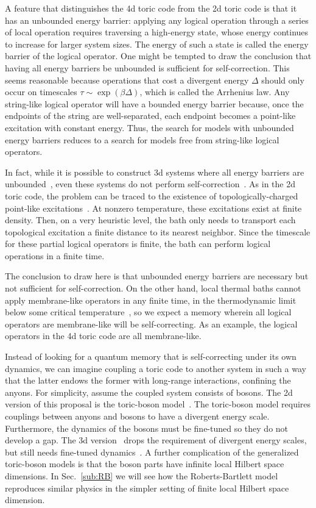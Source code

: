 A feature that distinguishes the 4d toric code from the 2d toric code is that it has an unbounded energy barrier: applying any logical operation through a series of local operation requires traversing a high-energy state, whose energy continues to increase for larger system sizes. The energy of such a state is called the energy barrier of the logical operator. One might be tempted to draw the conclusion that having all energy barriers be unbounded is sufficient for self-correction. This seems reasonable because operations that cost a divergent energy $\Delta$ should only occur on timescales $\tau \sim \exp (\beta \Delta)$, which is called the Arrhenius law. 
Any string-like logical operator will have a bounded energy barrier because, once the endpoints of the string are well-separated, each endpoint becomes a point-like excitation with constant energy. Thus, the search for models with unbounded energy barriers reduces to a search for models free from string-like logical operators.

In fact, while it is possible to construct 3d systems where all energy barriers are unbounded~\cite{Haah2011Code, Michnicki2014PowerLaw},
even these systems do not perform self-correction~\cite{Siva2017Marginally}. As in the 2d toric code, the problem can be traced to the existence of topologically-charged point-like excitations~\cite{PremHaahNandkishore2017}. At nonzero temperature, these excitations exist at finite density. Then, on a very heuristic level, the bath only needs to transport each topological excitation a finite distance to its nearest neighbor. Since the timescale for these partial logical operators is finite, the bath can perform logical operations in a finite time. 

The conclusion to draw here is that unbounded energy barriers are necessary but not sufficient for self-correction. On the other hand, local thermal baths cannot apply membrane-like operators in any finite time, in the thermodynamic limit below some critical temperature~\cite{Dennis2002Topological, RobertsBartlett2020}, so we expect a memory wherein all logical operators are membrane-like will be self-correcting. As an example, the logical operators in the 4d toric code are all membrane-like.

Instead of looking for a quantum memory that is self-correcting under its own dynamics, we can imagine coupling a toric code to another system in such a way that the latter endows the former with long-range interactions, confining the anyons. For simplicity, assume the coupled system consists of bosons. The 2d version of this proposal is the toric-boson model~\cite{Hamma2009Toric}. The toric-boson model requires couplings between anyons and bosons to have a divergent energy scale. Furthermore, the dynamics of the bosons must be fine-tuned so they do not develop a gap. The 3d version~\cite{Pedrocchi2013Thermal} drops the requirement of divergent energy scales, but still needs fine-tuned dynamics~\cite{LandonCardinal2015}. A further complication of the generalized toric-boson models is that the boson parts have infinite local Hilbert space dimensions. In Sec.~\ref{sub:RB} we will see how the Roberts-Bartlett model reproduces similar physics in the simpler setting of finite local Hilbert space dimension.

